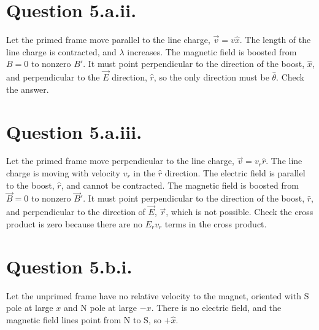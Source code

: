 \documentclass{article}
\begin{document}
\section*{Question 5.a.ii.}
Let the primed frame move parallel to the line charge, $\vec{v}=v\hat{x}$. The length of the line charge is contracted, and $\lambda$ increases.
\e{\gamma=\lorentz}
The magnetic field is boosted from $B=0$ to nonzero $B'$. It must point perpendicular to the direction of the boost, $\hat{x}$, and perpendicular to the $\vec{E}$ direction, $\hat{r}$, so the only direction must be $\hat{\theta}$. Check the answer.
\section*{Question 5.a.iii.}
Let the primed frame move perpendicular to the line charge, $\vec{v}=v_r\hat{r}$. The line charge is moving with velocity $v_r$ in the $\hat{r}$ direction. The electric field is parallel to the boost, $\hat{r}$, and cannot be contracted. The magnetic field is boosted from $\vec{B}=0$ to nonzero $\vec{B}'$. It must point perpendicular to the direction of the boost, $\hat{r}$, and perpendicular to the direction of $\vec{E}$, $\vec{r}$, which is not possible. Check the cross product is zero
because there are no $E_r v_r$ terms in the cross product.
\section*{Question 5.b.i.}
Let the unprimed frame have no relative velocity to the magnet, oriented with S pole at large $x$ and N pole at large $-x$. There is no electric field, and the magnetic field lines point from N to S, so $+\hat{x}$.
\end{document}
